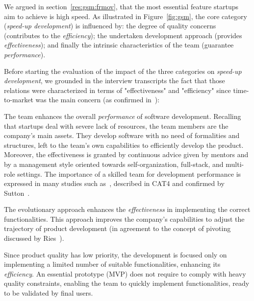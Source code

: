 \documentclass[10pt,journal,letterpaper,compsoc]{IEEEtran}
\begin{document}
We argued in section~\ref{res:gsm:frmov}, that the most essential feature
startups aim to achieve is high speed. As illustrated in Figure~\ref{fig:gsm},
the core category (\textit{speed-up development}) is influenced by: the degree
of quality concerns (contributes to the \textit{efficiency}); the undertaken
development approach (provides \textit{effectiveness}); and finally the
intrinsic characteristics of the team (guarantee \textit{performance}).

Before starting the evaluation of the impact of the three categories on 
\textit{speed-up development}, we grounded in the interview transcripts the fact 
that those relations were characterized in terms of "effectiveness" and 
"efficiency" since time-to-market was the main concern (as confirmed 
in~\cite{SMS}):

\begin{compactitem} 
\item The team enhances the overall \textit{performance} of
software development. Recalling that startups deal with severe lack of
resources, the team members are the company's main assets. They develop
software with no need of formalities and structures, left to the team's own
capabilities to efficiently develop the product. Moreover, the effectiveness is
granted by continuous advice given by mentors and by a management style
oriented towards self-organization, full-stack, and multi-role settings. The
importance of a skilled team for development performance is expressed in many
studies such as~\cite{surviving-os-cockburn, Highsmith2000}, described in CAT4
and confirmed by Sutton~\cite{Sutton2000}. 
\item The evolutionary approach enhances the \textit{effectiveness} in 
implementing the correct functionalities. This approach improves the company's 
capabilities to adjust the trajectory of product development (in agreement to 
the concept of pivoting discussed by Ries~\cite{Ries2011}). 
\item Since product quality has low priority, the development is focused only on 
implementing a limited number of suitable functionalities, enhancing its 
\textit{efficiency}. An essential prototype (MVP) does not require to comply 
with heavy quality constraints, enabling the team to quickly implement 
functionalities, ready to be validated by final users. 
\end{compactitem}
\end{document}
